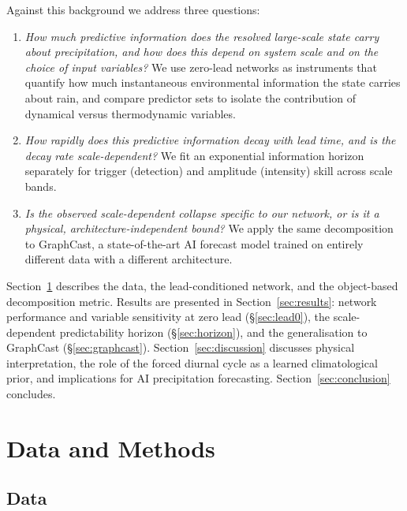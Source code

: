 \documentclass[11pt]{article}
\begin{document}
Against this background we address three questions:
\begin{enumerate}
  \item \emph{How much predictive information does the resolved large-scale state
        carry about precipitation, and how does this depend on system scale and
        on the choice of input variables?}
        We use zero-lead networks as instruments that quantify how much
        instantaneous environmental information the state carries about rain,
        and compare predictor sets to isolate the contribution of dynamical
        versus thermodynamic variables.
  \item \emph{How rapidly does this predictive information decay with lead time,
        and is the decay rate scale-dependent?}
        We fit an exponential information horizon separately for trigger
        (detection) and amplitude (intensity) skill across scale bands.
  \item \emph{Is the observed scale-dependent collapse specific to our network,
        or is it a physical, architecture-independent bound?}
        We apply the same decomposition to GraphCast, a state-of-the-art AI
        forecast model trained on entirely different data with a different
        architecture.
\end{enumerate}

Section~\ref{sec:methods} describes the data, the lead-conditioned network, and
the object-based decomposition metric.
Results are presented in Section~\ref{sec:results}: network performance and
variable sensitivity at zero lead (\S\ref{sec:lead0}), the scale-dependent
predictability horizon (\S\ref{sec:horizon}), and the generalisation to
GraphCast (\S\ref{sec:graphcast}).
Section~\ref{sec:discussion} discusses physical interpretation, the role of the
forced diurnal cycle as a learned climatological prior, and implications for AI
precipitation forecasting.
Section~\ref{sec:conclusion} concludes.

\section{Data and Methods}
\label{sec:methods}

\subsection{Data}
\label{sec:data}
\end{document}
